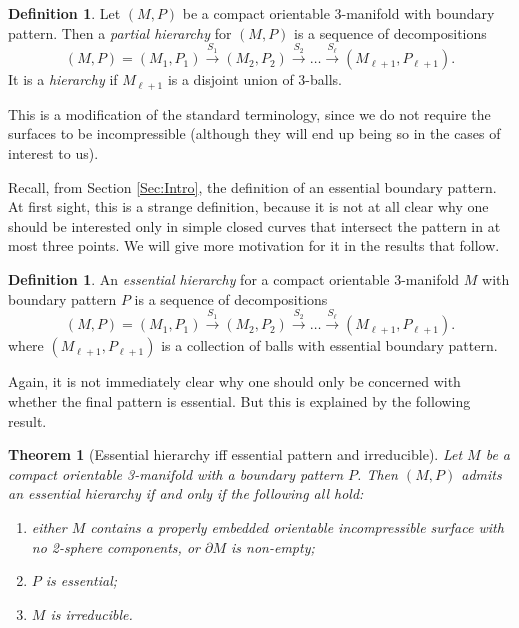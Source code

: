 \documentclass[oneside]{amsart}
\numberwithin{equation}{section}
\theoremstyle{plain}
\newtheorem{theorem}[equation]{Theorem}
\theoremstyle{definition}
\newtheorem{definition}[equation]{Definition}
\begin{document}
\begin{definition}
\label{Def:Hierarchy}
Let $(M,P)$ be a compact orientable 3-manifold with boundary pattern. Then a \emph{partial hierarchy} for $(M,P)$ is a sequence of decompositions
$$(M, P)  = (M_1,P_1) \xrightarrow{S_1} (M_2, P_2) \xrightarrow{S_2} \dots \xrightarrow{S_\ell} (M_{\ell+1}, P_{\ell+1}).$$
It is a \emph{hierarchy} if $M_{\ell+1}$ is a disjoint union of 3-balls. 
\end{definition}

This is a modification of the standard terminology, since we do not require the surfaces to be incompressible (although they will end up being so in the cases
of interest to us).


Recall, from Section \ref{Sec:Intro}, the definition of an essential boundary pattern.
At first sight, this is a strange definition, because it is not at all clear why one should be interested only in simple closed curves
that intersect the pattern in at most three points. We will give more motivation for it in the results that follow. 

\begin{definition}
\label{Def:EssentialHierarchy} 
An \emph{essential hierarchy} for a compact orientable 3-manifold $M$ with boundary pattern $P$ is a 
sequence of decompositions
$$(M, P)  = (M_1,P_1) \xrightarrow{S_1} (M_2, P_2) \xrightarrow{S_2} \dots \xrightarrow{S_\ell} (M_{\ell+1}, P_{\ell+1}).$$
where $(M_{\ell+1}, P_{\ell+1})$ is a collection of balls with essential boundary pattern.
\end{definition}

Again, it is not immediately clear why one should only be concerned with whether the final pattern is essential. But this is
explained by the following result.


\begin{theorem}[Essential hierarchy iff essential pattern and irreducible]
\label{Thm:EssentialHierarchy}
Let $M$ be a compact orientable 3-manifold with a boundary pattern $P$.
Then $(M,P)$ admits an essential hierarchy if and only if the following all hold:
\begin{enumerate}
\item either $M$ contains a properly embedded orientable incompressible surface with no 2-sphere components, or $\partial M$ is non-empty;
\item $P$ is essential;
\item $M$ is irreducible.
\end{enumerate}
\end{theorem}
\end{document}
